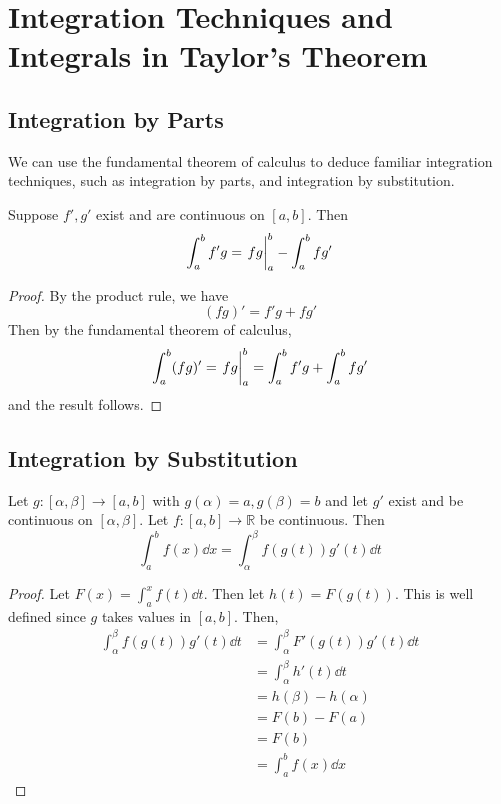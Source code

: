 \documentclass{article}
\begin{document}
\section{Integration Techniques and Integrals in Taylor's Theorem}
\subsection{Integration by Parts}
We can use the fundamental theorem of calculus to deduce familiar integration techniques, such as integration by parts, and integration by substitution.
\begin{corollary}
	Suppose $f', g'$ exist and are continuous on $[a, b]$. Then
	\[ \int_a^b f'g = \eval{fg}_a^b - \int_a^b fg' \]
\end{corollary}
\begin{proof}
	By the product rule, we have
	\[ (fg)' = f'g + fg' \]
	Then by the fundamental theorem of calculus,
	\[ \int_a^b (fg)' = \eval{fg}_a^b = \int_a^b f'g + \int_a^b fg' \]
	and the result follows.
\end{proof}

\subsection{Integration by Substitution}
\begin{corollary}
	Let $g \colon [\alpha, \beta] \to [a, b]$ with $g(\alpha) = a, g(\beta) = b$ and let $g'$ exist and be continuous on $[\alpha, \beta]$. Let $f \colon [a, b] \to \mathbb R$ be continuous. Then
	\[ \int_a^b f(x)\dd{x} = \int_\alpha^\beta f(g(t))g'(t)\dd{t} \]
\end{corollary}
\begin{proof}
	Let $F(x) = \int_a^x f(t) \dd{t}$. Then let $h(t) = F(g(t))$. This is well defined since $g$ takes values in $[a, b]$. Then,
	\begin{align*}
		\int_\alpha^\beta f(g(t))g'(t)\dd{t} &= \int_\alpha^\beta F'(g(t))g'(t) \dd{t} \\
		&= \int_\alpha^\beta h'(t) \dd{t} \\
		&= h(\beta) - h(\alpha) \\
		&= F(b) - F(a) \\
		&= F(b) \\
		&= \int_a^b f(x) \dd{x}
	\end{align*}
\end{proof}
\end{document}
